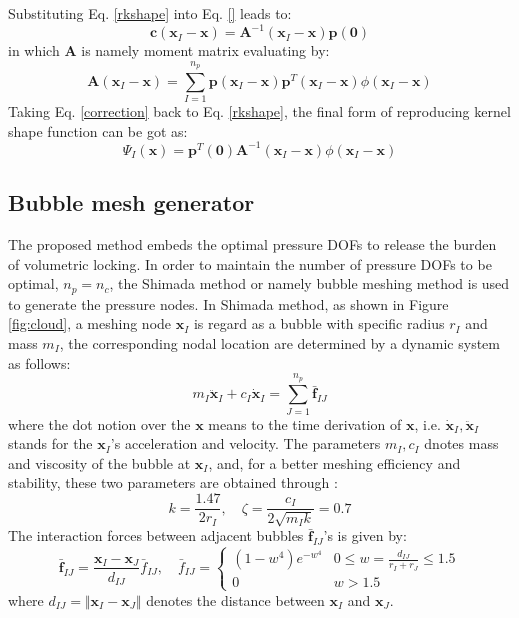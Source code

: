 Substituting Eq. \ref{rkshape} into Eq. \eqref{} leads to:
\begin{equation}\label{correction}
\boldsymbol c(\boldsymbol x_I-\boldsymbol x) = \boldsymbol A^{-1}(\boldsymbol x_I-\boldsymbol x)\boldsymbol p(\boldsymbol 0)
\end{equation}
in which $\boldsymbol A$ is namely moment matrix evaluating by:
\begin{equation}
\boldsymbol A(\boldsymbol x_I-\boldsymbol x) = \sum_{I=1}^{n_p}\boldsymbol p(\boldsymbol x_I-\boldsymbol x) \boldsymbol p^T(\boldsymbol x_I-\boldsymbol x)\phi(\boldsymbol x_I-\boldsymbol x)
\end{equation}
Taking Eq. \eqref{correction} back to Eq. \eqref{rkshape}, the final form of reproducing kernel shape function can be got as:
\begin{equation}
\Psi_I(\boldsymbol x) = \boldsymbol p^T(\boldsymbol 0) \boldsymbol A^{-1}(\boldsymbol x_I-\boldsymbol x)\phi(\boldsymbol x_I-\boldsymbol x)
\end{equation}

\subsection{Bubble mesh generator}
The proposed method embeds the optimal pressure DOFs to release the burden of volumetric locking. In order to maintain the number of pressure DOFs to be optimal, $n_p=n_c$, the Shimada method or namely bubble meshing method is used to generate the pressure nodes. 
In Shimada method, as shown in Figure \ref{fig:cloud}, a meshing node $\boldsymbol x_I$ is regard as a bubble with specific radius $r_I$ and mass $m_I$, the corresponding nodal location are determined by a dynamic system as follows:
\begin{equation} \label{bubble1}
    m_I \ddot{\boldsymbol x}_{I} + c_I \dot{\boldsymbol x}_I = \sum_{J=1}^{n_p} \bar{\boldsymbol f}_{IJ}
\end{equation}
where the dot notion over the $\boldsymbol x$ means to the time derivation of $\boldsymbol x$, i.e. $\dot{\boldsymbol x}_I, \ddot{\boldsymbol x}_I$ stands for the $\boldsymbol x_I$'s acceleration and velocity. 
The parameters $m_I, c_I$ dnotes mass and viscosity of the bubble at $\boldsymbol x_I$, and, for a better meshing efficiency and stability, these two parameters are obtained through \cite{dinh2017}:
\begin{equation} \label{bubble2}
    k = \frac{1.47}{2r_I}, \quad \zeta = \frac{c_I}{2\sqrt{m_I k}} = 0.7
\end{equation}
The interaction forces between adjacent bubbles $\bar{\boldsymbol f}_{IJ}$'s is given by:
\begin{equation}
\bar{\boldsymbol f}_{IJ} = \frac{\boldsymbol x_I - \boldsymbol x_J}{d_{IJ}} \bar f_{IJ}, \quad
\bar f_{IJ} =
\begin{cases}
    (1-w^4) e^{-w^4} & 0\le w= \frac{d_{IJ}}{r_I+r_J} \le 1.5 \\
    0 & w>1.5
\end{cases}
\end{equation}
where $d_{IJ} = \Vert \boldsymbol x_I - \boldsymbol x_J \Vert$ denotes the distance between $\boldsymbol x_I$ and $\boldsymbol x_J$.

